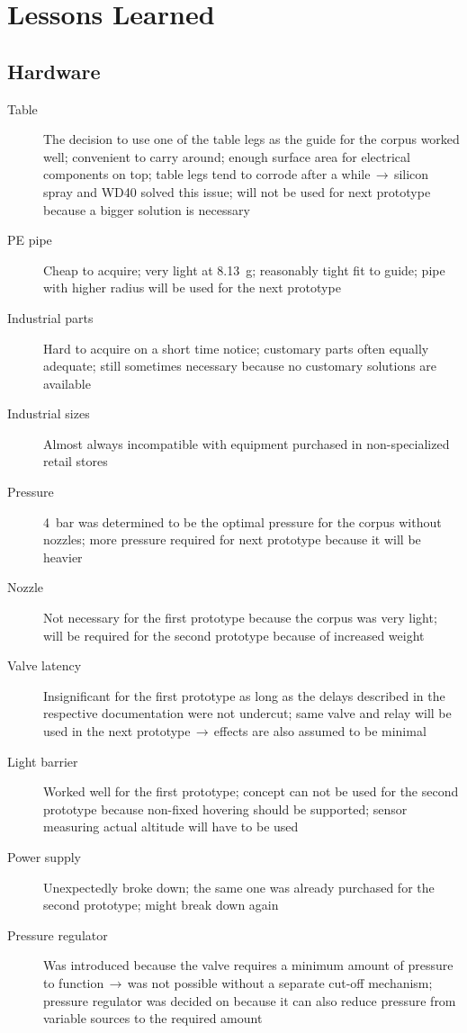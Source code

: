 \section{Lessons Learned}
\subsection{Hardware}
\author{Sebastian Schaffler}

\begin{description}
\item [Table] The decision to use one of the table legs as the guide for the corpus worked well; convenient to carry around; enough surface area for electrical components on top; table legs tend to corrode after a while$\,\to\,$silicon spray and WD40 solved this issue; will not be used for next prototype because a bigger solution is necessary
\item [PE pipe] Cheap to acquire; very light at \SI{8,13}{\gram}; reasonably tight fit to guide; pipe with higher radius will be used for the next prototype
\item [Industrial parts] Hard to acquire on a short time notice; customary parts often equally adequate; still sometimes necessary because no customary solutions are available
\item [Industrial sizes] Almost always incompatible with equipment purchased in non-specialized retail stores
\item [Pressure] \SI{4}{\bar} was determined to be the optimal pressure for the corpus without nozzles; more pressure required for next prototype because it will be heavier
\item [Nozzle] Not necessary for the first prototype because the corpus was very light; will be required for the second prototype because of increased weight
\item [Valve latency] Insignificant for the first prototype as long as the delays described in the respective documentation were not undercut; same valve and relay will be used in the next prototype$\,\to\,$effects are also assumed to be minimal
\item [Light barrier] Worked well for the first prototype; concept can not be used for the second prototype because non-fixed hovering should be supported; sensor measuring actual altitude will have to be used
\item [Power supply] Unexpectedly broke down; the same one was already purchased for the second prototype; might break down again
\item [Pressure regulator] Was introduced because the valve requires a minimum amount of pressure to function$\,\to\,$was not possible without a separate cut-off mechanism; pressure regulator was decided on because it can also reduce pressure from variable sources to the required amount
\end{description}


